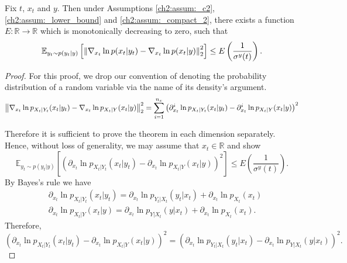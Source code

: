 \begin{customthm}{3}
    Fix $t$, $x_t$ and $y$. Then under Assumptions \ref{ch2:assum:_c2}, \ref{ch2:assum:_lower_bound} and \ref{ch2:assum:_compact_2}, there exists a function $E: \mathbb{R} \xrightarrow{} \mathbb{R}$ which is monotonically decreasing to zero, such that
    \[
\mathbb{E}_{y_t \sim p(y_t|y)}\left[\left\lVert  \nabla_{x_t} \ln p(x_t|y_t) - \nabla_{x_t} \ln p(x_t|y) \right\rVert_2^2 \right] \leq E\left( \frac{1}{\sigma^y(t)} \right).
\]
\end{customthm}
\begin{proof}
    For this proof, we drop our convention of denoting the probability distribution of a random variable via the name of its density’s argument.
   \[
\left\lVert  \nabla_{x_t} \ln p_{X_t | Y_t}(x_t|y_t) - \nabla_{x_t} \ln p_{X_t | Y}(x_t|y) \right\rVert_2^2
= \sum_{i=1}^{n_x} \left( \partial^i_{x_t} \ln p_{X_t | Y_t}(x_t|y_t) - \partial^i_{x_t} \ln p_{X_t | Y}(x_t|y) \right)^2
\]

    Therefore it is sufficient to prove the theorem in each dimension separately. Hence, without loss of generality, we may assume that $x_t \in \mathbb{R}$ and show
    \[
\mathbb{E}_{y_t \sim p(y_t|y)}\left[
    \left( \partial_{x_t} \ln p_{X_t | Y_t}(x_t|y_t) - \partial_{x_t} \ln p_{X_t | Y}(x_t|y) \right)^2
\right] 
\leq E\left( \frac{1}{\sigma^y(t)} \right).
\]
    By Bayes's rule we have
    \begin{align*}
        &\partial_{x_t} \ln p_{X_t | Y_t}(x_t|y_t)  =  \partial_{x_t} \ln p_{Y_t | X_t}(y_t | x_t) + \partial_{x_t} \ln p_{X_t}(x_t)
        \\ &\partial_{x_t} \ln  p_{X_t | Y}(x_t|y)  = \partial_{x_t} \ln p_{Y | X_t}(y | x_t) + \partial_{x_t} \ln p_{X_t}(x_t).
    \end{align*}
    Therefore,
    \[
\left(  \partial_{x_t} \ln p_{X_t | Y_t}(x_t|y_t)  - \partial_{x_t} \ln p_{X_t | Y}(x_t|y) \right)^2
= \left( \partial_{x_t} \ln p_{Y_t | X_t}(y_t | x_t) - \partial_{x_t} \ln p_{Y | X_t}(y | x_t) \right)^2.
\]


\end{proof}
